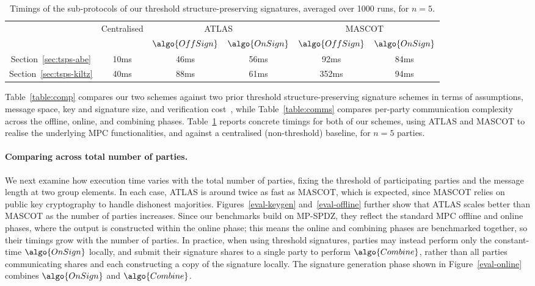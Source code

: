\begin{table}[!ht]
  \centering
  \begin{tabular}{ c || c || c | c || c | c }
   \toprule
    & Centralised & \multicolumn{2}{c||}{ATLAS~\cite{C:GLOPS21}} & \multicolumn{2}{c}{MASCOT~\cite{CCS:KelOrsSch16}} \\
    & & $\algo{OffSign}$ & $\algo{OnSign}$ & $\algo{OffSign}$ & $\algo{OnSign}$ \\
   \midrule
    Section~\ref{sec:tsps-abe} & 10ms & 46ms & 56ms & 92ms & 84ms \\
    Section~\ref{sec:tsps-kiltz} & 40ms & 88ms & 61ms & 352ms & 94ms \\
   \bottomrule
  \end{tabular}
  \caption{Timings of the sub-protocols of our threshold structure-preserving
  signatures, averaged over 1000 runs, for $n = 5$.}
  \label{table:benchmarks}
\end{table}

Table~\ref{table:comp} compares our two schemes against two prior threshold
structure-preserving signature schemes in terms of assumptions, message
space, key and signature size, and verification
cost~\cite{AC:CKPSS23,PKC:MMSST24}, while Table~\ref{table:comms} compares
per-party communication complexity across the offline, online, and combining
phases. Table~\ref{table:benchmarks} reports concrete timings for both of our
schemes, using ATLAS and MASCOT to realise the underlying MPC
functionalities, and against a centralised (non-threshold) baseline, for $n =
5$ parties.

\paragraph{Comparing across total number of parties.} We next examine how
execution time varies with the total number of parties, fixing the threshold
of participating parties and the message length at two group elements. In
each case, ATLAS is around twice as fast as MASCOT, which is expected, since
MASCOT relies on public key cryptography to handle dishonest majorities.
Figures~\ref{eval-keygen} and~\ref{eval-offline} further show that ATLAS
scales better than MASCOT as the number of parties increases. Since our
benchmarks build on MP-SPDZ, they reflect the standard MPC offline and online
phases, where the output is constructed within the online phase; this means
the online and combining phases are benchmarked together, so their timings
grow with the number of parties. In practice, when using threshold
signatures, parties may instead perform only the constant-time $\algo{OnSign}$
locally, and submit their signature shares to a single party to perform
$\algo{Combine}$, rather than all parties communicating shares and each
constructing a copy of the signature locally. The signature generation phase
shown in Figure~\ref{eval-online} combines $\algo{OnSign}$ and $\algo{Combine}$.
